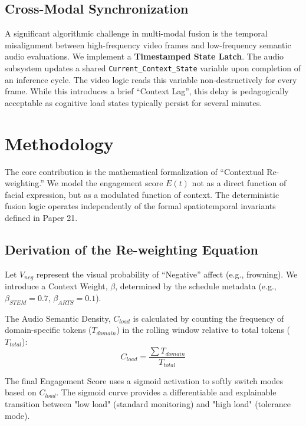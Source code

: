 \documentclass[conference]{IEEEtran}
\begin{document}
\subsection{Cross-Modal Synchronization}
A significant algorithmic challenge in multi-modal fusion is the temporal misalignment between high-frequency video frames and low-frequency semantic audio evaluations. We implement a \textbf{Timestamped State Latch}. The audio subsystem updates a shared \texttt{Current\_Context\_State} variable upon completion of an inference cycle. The video logic reads this variable non-destructively for every frame. While this introduces a brief ``Context Lag'', this delay is pedagogically acceptable as cognitive load states typically persist for several minutes.

\section{Methodology}

The core contribution is the mathematical formalization of ``Contextual Re-weighting.'' We model the engagement score $E(t)$ not as a direct function of facial expression, but as a modulated function of context. The deterministic fusion logic operates independently of the formal spatiotemporal invariants defined in Paper 21.

\subsection{Derivation of the Re-weighting Equation}
Let $V_{neg}$ represent the visual probability of ``Negative'' affect (e.g., frowning). We introduce a Context Weight, $\beta$, determined by the schedule metadata (e.g., $\beta_{STEM} = 0.7$, $\beta_{ARTS} = 0.1$). 

The Audio Semantic Density, $C_{load}$ is calculated by counting the frequency of domain-specific tokens ($T_{domain}$) in the rolling window relative to total tokens ($T_{total}$):
\begin{equation}
C_{load} = \frac{\sum T_{domain}}{T_{total}}
\end{equation}

The final Engagement Score uses a sigmoid activation to softly switch modes based on $C_{load}$. The sigmoid curve provides a differentiable and explainable transition between "low load" (standard monitoring) and "high load" (tolerance mode).
\end{document}
